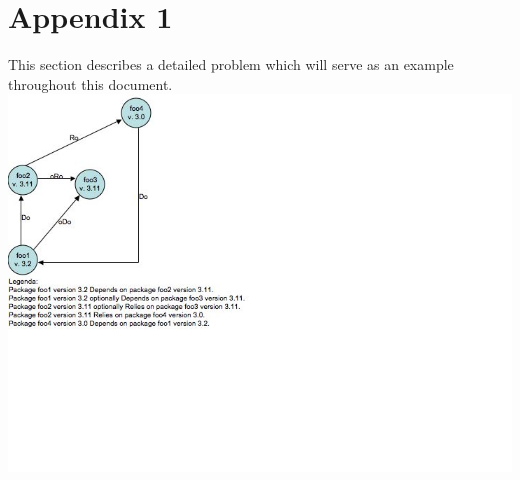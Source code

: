  \section{Appendix 1}
 This section describes a detailed problem which will serve as an example throughout this document.\\
 \includegraphics{problem/Slide1.jpg}
